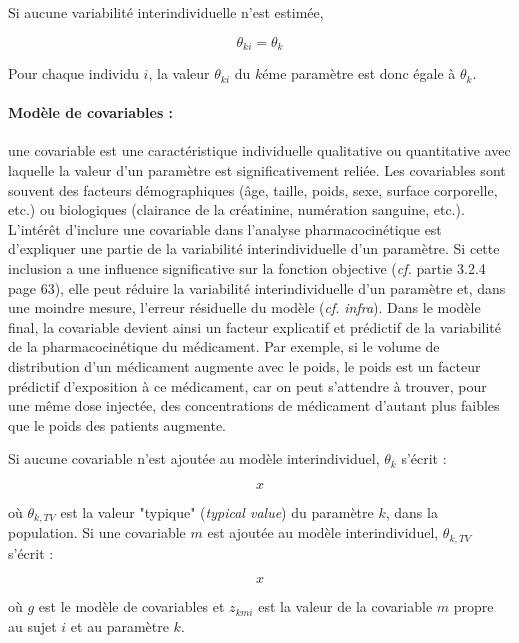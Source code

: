 Si aucune variabilité interindividuelle n'est estimée,

\begin{equation}
\theta_{ki} = \theta_k
\label{eq:43}
\end{equation}

Pour chaque individu $i$, la valeur $\theta_{ki}$ du $k$éme paramètre est donc égale à $\theta_k$.

\paragraph*{Modèle de covariables :} une covariable est une caractéristique individuelle qualitative ou quantitative avec laquelle la valeur d'un paramètre est significativement reliée. Les covariables sont souvent des facteurs démographiques (âge, taille, poids, sexe, surface corporelle, etc.) ou biologiques (clairance de la créatinine, numération sanguine, etc.). L'intérêt d'inclure une covariable dans l'analyse pharmacocinétique est d'expliquer une partie de la variabilité interindividuelle d'un paramètre. Si cette inclusion a une influence significative sur la fonction objective (\textit{cf.} partie 3.2.4 page 63), elle peut réduire la variabilité interindividuelle d'un paramètre et, dans une moindre mesure, l'erreur résiduelle du modèle (\textit{cf.} \textit{infra}). Dans le modèle final, la covariable devient ainsi un facteur explicatif et prédictif de la variabilité de la pharmacocinétique du médicament. Par exemple, si le volume de distribution d'un médicament augmente avec le poids, le poids est un facteur prédictif d'exposition à ce médicament, car on peut s'attendre à trouver, pour une même dose injectée, des concentrations de médicament d'autant plus faibles que le poids des patients augmente. 

Si aucune covariable n'est ajoutée au modèle interindividuel, $\theta_k$ s'écrit :

\begin{equation}
x
\label{eq:44}
\end{equation}

où $\theta_{k,TV}$ est la valeur "typique" (\textit{typical value}) du paramètre $k$, dans la population. Si une covariable $m$ est ajoutée au modèle interindividuel, $\theta_{k,TV}$ s'écrit :

\begin{equation}
x
\label{eq:45}
\end{equation}

où $g$ est le modèle de covariables et $z_{kmi}$ est la valeur de la covariable $m$ propre au sujet $i$ et au paramètre $k$.

